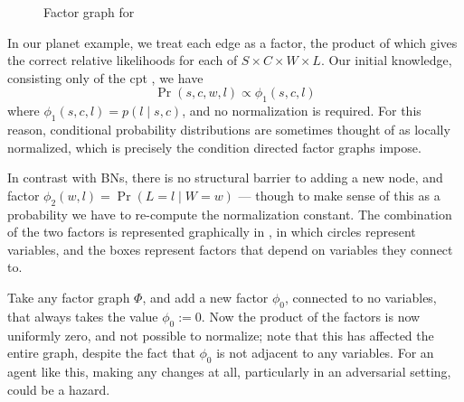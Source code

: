 	
	\begin{example}[continues=ex:planet]
		\begin{figure}[h]
			\centering
			\caption{Factor graph for }
			\label{fig:planet-factorgraph}
		\end{figure}
	
		In our planet example, we treat each edge as a factor, the product of which gives the correct relative likelihoods for each of $S \times C \times W \times L$. Our initial knowledge, consisting only of the cpt , we have 
		\[ \Pr(s, c, w, l) \propto \phi_1(s,c,l)  \]
		where $\phi_1(s,c,l) = p(l \mid s,c)$, and no normalization is required. For this reason, conditional probability distributions are sometimes thought of as locally normalized, which is precisely the condition directed factor graphs \parencite{frey2012extending} impose.

		In contrast with BNs, there is no structural barrier to adding a new node, and factor $\phi_2(w,l) \!=\! \Pr(L\!=\!l\mid W\!=\!w)$ --- though to make sense of this as a probability we have to re-compute the normalization constant. The combination of the two factors is represented graphically in , in which circles represent variables, and the boxes represent factors that depend on variables they connect to. 
	\end{example}	
	\begin{example}\label{ex:fg-volatile}
		Take any factor graph $\Phi$, and add a new factor $\phi_0$, connected to no variables, that always takes the value $\phi_0 := 0$. Now the product of the factors is now uniformly zero, and not possible to normalize; note that this has affected the entire graph, despite the fact that $\phi_0$ is not adjacent to any variables. For an agent like this, making any changes at all, particularly in an adversarial setting, could be a hazard.
	\end{example}

